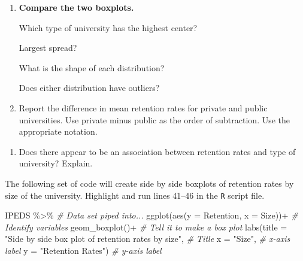 \documentclass[
]{report}
\newenvironment{Shaded}{\begin{snugshade}}{\end{snugshade}}
\newcommand{\AttributeTok}[1]{\textcolor[rgb]{0.77,0.63,0.00}{#1}}
\newcommand{\CommentTok}[1]{\textcolor[rgb]{0.56,0.35,0.01}{\textit{#1}}}
\newcommand{\FunctionTok}[1]{\textcolor[rgb]{0.00,0.00,0.00}{#1}}
\newcommand{\NormalTok}[1]{#1}
\newcommand{\SpecialCharTok}[1]{\textcolor[rgb]{0.00,0.00,0.00}{#1}}
\newcommand{\StringTok}[1]{\textcolor[rgb]{0.31,0.60,0.02}{#1}}
\providecommand{\tightlist}{%
  \setlength{\itemsep}{0pt}\setlength{\parskip}{0pt}}
\begin{document}
\begin{enumerate}
\def\labelenumi{\arabic{enumi}.}
\setcounter{enumi}{11}
\item
  \textbf{Compare the two boxplots.}

  Which type of university has the highest center?
  \vspace{0.3in}

  Largest spread?
  \vspace{0.3in}

  What is the shape of each distribution?
  \vspace{0.3in}

  Does either distribution have outliers?
  \vspace{0.3in}
\item
  Report the difference in mean retention rates for private and public universities. Use private minus public as the order of subtraction. Use the appropriate notation.
\end{enumerate}

\vspace{0.8in}

\begin{enumerate}
\def\labelenumi{\arabic{enumi}.}
\setcounter{enumi}{13}
\tightlist
\item
  Does there appear to be an association between retention rates and type of university? Explain.
\end{enumerate}

\vspace{0.8in}

The following set of code will create side by side boxplots of retention rates by size of the university. Highlight and run lines 41--46 in the \texttt{R} script file.

\begin{Shaded}
\begin{Highlighting}[]
\NormalTok{IPEDS }\SpecialCharTok{\%\textgreater{}\%}  \CommentTok{\# Data set piped into...}
  \FunctionTok{ggplot}\NormalTok{(}\FunctionTok{aes}\NormalTok{(}\AttributeTok{y =}\NormalTok{ Retention, }\AttributeTok{x =}\NormalTok{ Size))}\SpecialCharTok{+}  \CommentTok{\# Identify variables}
  \FunctionTok{geom\_boxplot}\NormalTok{()}\SpecialCharTok{+}  \CommentTok{\# Tell it to make a box plot}
  \FunctionTok{labs}\NormalTok{(}\AttributeTok{title =} \StringTok{"Side by side box plot of retention rates by size"}\NormalTok{,  }\CommentTok{\# Title}
       \AttributeTok{x =} \StringTok{"Size"}\NormalTok{,    }\CommentTok{\# x{-}axis label}
       \AttributeTok{y =} \StringTok{"Retention Rates"}\NormalTok{)  }\CommentTok{\# y{-}axis label}
\end{Highlighting}
\end{Shaded}
\end{document}
